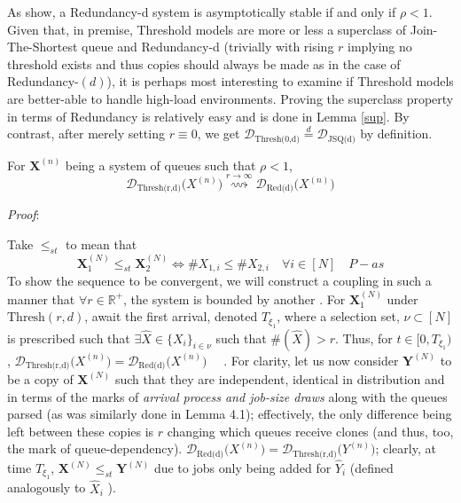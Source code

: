 As \cite{gardner_redundancy-d_2017} show, a Redundancy-d system is asymptotically stable if and only if $\rho < 1 $. Given that, in premise, Threshold models are more or less a superclass of Join-The-Shortest queue and Redundancy-d (trivially with rising $r$  implying no threshold exists and thus copies should always be made as in the case of Redundancy-$(d)$), it is perhaps most interesting to examine if Threshold models are better-able to handle high-load environments. Proving the superclass property in terms of Redundancy is relatively easy and is done in Lemma \ref{sup}.  By contrast, after merely setting $r \equiv 0$, we get $ \mathcal{D}_{\text{Thresh(0,d)}} \overset{d}{=} \mathcal{D}_{\text{JSQ(d)}}$ by definition.


\begin{lemma}
	\label{sup}
	For $\mathbf{X}^{(n)}$ being a system of queues such that $\rho < 1$, \[\mathcal{D}_{\text{Thresh(r,d)}}\mathbf(X^{(n)}) \overset{r \rightarrow \infty}{\rightsquigarrow} \mathcal{D}_{\text{Red(d)}}\mathbf(X^{(n)})\]
\end{lemma}
\textit{Proof}:

Take $\leq_{st}$ to mean that \cite{bramson_asymptotic_2012} 
\[\mathbf{X}_{1}^{(N)}\leq_{st}\mathbf{X}_{2}^{(N)} \iff\# X_{1,i} \leq \# X_{2,i}  \quad \forall i \in [N] \quad P-as\]	
To show the sequence to be convergent, we will construct a coupling in such a manner that $\forall r \in \mathbb{R}^{+}$,  the system is bounded by another  \cite{baccelli_elements_2003} .  For $\mathbf{X}_{1}^{(N)}$ under $\text{Thresh}(r,d)$, await the first arrival, denoted $T_{\xi_{1}}$, where a selection set, $\nu \subset [N] $ is prescribed such that $\exists \hat X \in \{X_{i}\}_{i \in \nu} $ such that $ \# (\hat X) > r $.  Thus, for  $ t \in [0,T_{\xi_{1}})$, $\mathcal{D}_{\text{Thresh(r,d)}}\mathbf(X^{(n)}) = \mathcal{D}_{\text{Red(d)}}\mathbf(X^{(n)}) \quad$ . For clarity, let us now consider $\mathbf{Y}^{(N)}$ to be a copy of  $\mathbf{X}^{(N)}$ such that they are independent, identical in distribution and in terms of the marks of \textit{arrival process and job-size draws} along with the queues parsed (as was similarly done in \cite{bramson_asymptotic_2012} Lemma 4.1); effectively, the only difference being left between these copies is $r$ changing which queues receive clones (and thus, too, the mark of queue-dependency).  $\mathcal{D}_{\text{Red(d)}}\mathbf(X^{(n)}) = \mathcal{D}_{\text{Thresh(r,d)}}\mathbf(Y^{(n)}) $; clearly, at time $T_{\xi_{1}}$, $\mathbf{X}^{(N)}\leq_{st}\mathbf{Y}^{(N)} $
due to jobs only being added for ${\hat Y_{i}}$ (defined analogously to  ${\hat X_{i}}$ ).


